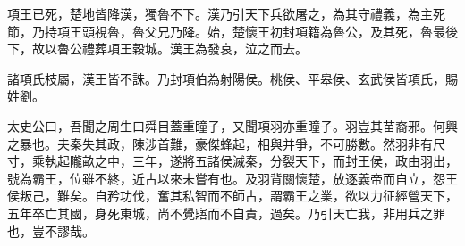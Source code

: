 項王已死，楚地皆降漢，獨魯不下。漢乃引天下兵欲屠之，為其守禮義，為主死節，乃持項王頭視魯，魯父兄乃降。始，楚懷王初封項籍為魯公，及其死，魯最後下，故以魯公禮葬項王穀城。漢王為發哀，泣之而去。

諸項氏枝屬，漢王皆不誅。乃封項伯為射陽侯。桃侯、平皋侯、玄武侯皆項氏，賜姓劉。

太史公曰，吾聞之周生曰舜目蓋重瞳子，又聞項羽亦重瞳子。羽豈其苗裔邪。何興之暴也。夫秦失其政，陳涉首難，豪傑蜂起，相與并爭，不可勝數。然羽非有尺寸，乘執起隴畝之中，三年，遂將五諸侯滅秦，分裂天下，而封王侯，政由羽出，號為霸王，位雖不終，近古以來未嘗有也。及羽背關懷楚，放逐義帝而自立，怨王侯叛己，難矣。自矜功伐，奮其私智而不師古，謂霸王之業，欲以力征經營天下，五年卒亡其國，身死東城，尚不覺寤而不自責，過矣。乃引天亡我，非用兵之罪也，豈不謬哉。
